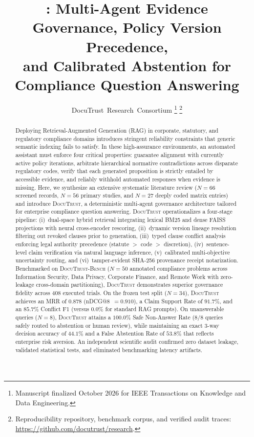 \documentclass[journal,twoside]{IEEEtran}
\title{\sysname: Multi-Agent Evidence Governance, Policy Version Precedence,\\
       and Calibrated Abstention for Compliance Question Answering}
\author{%
  DocuTrust~Research~Consortium%
  \thanks{Manuscript finalized October 2026 for IEEE Transactions on Knowledge and Data Engineering.}%
  \thanks{Reproducibility repository, benchmark corpus, and verified audit traces:
          \url{https://github.com/docutrust/research}.}
}
\newcommand{\sysname}{\textsc{DocuTrust}}
\newcommand{\bench}{\textsc{DocuTrust-Bench}}
\begin{document}
\maketitle

\begin{abstract}
Deploying Retrieval-Augmented Generation (RAG) in corporate, statutory, and regulatory compliance domains introduces stringent reliability constraints that generic semantic indexing fails to satisfy.
In these high-assurance environments, an automated assistant must enforce four critical properties: guarantee alignment with currently active policy iterations, arbitrate hierarchical normative contradictions across disparate regulatory codes, verify that each generated proposition is strictly entailed by accessible evidence, and reliably withhold automated responses when evidence is missing.
Here, we synthesize an extensive systematic literature review ($N=66$ screened records, $N=56$ primary studies, and $N=27$ deeply coded matrix entries) and introduce \sysname{}, a deterministic multi-agent governance architecture tailored for enterprise compliance question answering.
\sysname{} operationalizes a four-stage pipeline:
(i)~dual-space hybrid retrieval integrating lexical BM25 and dense FAISS projections with neural cross-encoder rescoring,
(ii)~dynamic version lineage resolution filtering out revoked clauses prior to generation,
(iii)~typed clause conflict analysis enforcing legal authority precedence (statute $>$ code $>$ discretion),
(iv)~sentence-level claim verification via natural language inference,
(v)~calibrated multi-objective uncertainty routing, and
(vi)~tamper-evident SHA-256 provenance receipt notarization.
Benchmarked on \bench{} ($N=50$ annotated compliance problems across Information Security, Data Privacy, Corporate Finance, and Remote Work with zero-leakage cross-domain partitioning), \sysname{} demonstrates superior governance fidelity across 408 executed trials.
On the frozen test split ($N=34$), \sysname{} achieves an MRR of $0.878$ (nDCG@8~$=0.910$), a Claim Support Rate of $91.7\%$, and an $85.7\%$ Conflict F1 (versus $0.0\%$ for standard RAG prompts).
On unanswerable queries ($N=8$), \sysname{} attains a $100.0\%$ Safe Non-Answer Rate ($8/8$ queries safely routed to abstention or human review), while maintaining an exact 3-way decision accuracy of $44.1\%$ and a False Abstention Rate of $53.8\%$ that reflects enterprise risk aversion.
An independent scientific audit confirmed zero dataset leakage, validated statistical tests, and eliminated benchmarking latency artifacts.
\end{abstract}
\end{document}
